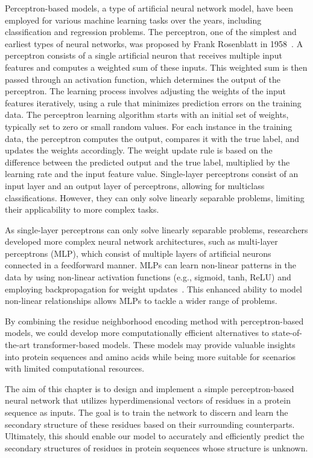 Perceptron-based models, a type of artificial neural network model, have been employed for various machine learning tasks over the years, including classification and regression problems. The perceptron, one of the simplest and earliest types of neural networks, was proposed by Frank Rosenblatt in 1958~\cite{perceptron}. A perceptron consists of a single artificial neuron that receives multiple input features and computes a weighted sum of these inputs. This weighted sum is then passed through an activation function, which determines the output of the perceptron. The learning process involves adjusting the weights of the input features iteratively, using a rule that minimizes prediction errors on the training data. The perceptron learning algorithm starts with an initial set of weights, typically set to zero or small random values. For each instance in the training data, the perceptron computes the output, compares it with the true label, and updates the weights accordingly. The weight update rule is based on the difference between the predicted output and the true label, multiplied by the learning rate and the input feature value. Single-layer perceptrons consist of an input layer and an output layer of perceptrons, allowing for multiclass classifications. However, they can only solve linearly separable problems, limiting their applicability to more complex tasks.

As single-layer perceptrons can only solve linearly separable problems, researchers developed more complex neural network architectures, such as multi-layer perceptrons (MLP), which consist of multiple layers of artificial neurons connected in a feedforward manner. MLPs can learn non-linear patterns in the data by using non-linear activation functions (e.g., sigmoid, tanh, ReLU) and employing backpropagation for weight updates~\cite{mlp}. This enhanced ability to model non-linear relationships allows MLPs to tackle a wider range of problems.

By combining the residue neighborhood encoding method with perceptron-based models, we could develop more computationally efficient alternatives to state-of-the-art transformer-based models. These models may provide valuable insights into protein sequences and amino acids while being more suitable for scenarios with limited computational resources. 

The aim of this chapter is to design and implement a simple perceptron-based neural network that utilizes hyperdimensional vectors of residues in a protein sequence as inputs. The goal is to train the network to discern and learn the secondary structure of these residues based on their surrounding counterparts. Ultimately, this should enable our model to accurately and efficiently predict the secondary structures of residues in protein sequences whose structure is unknown.

